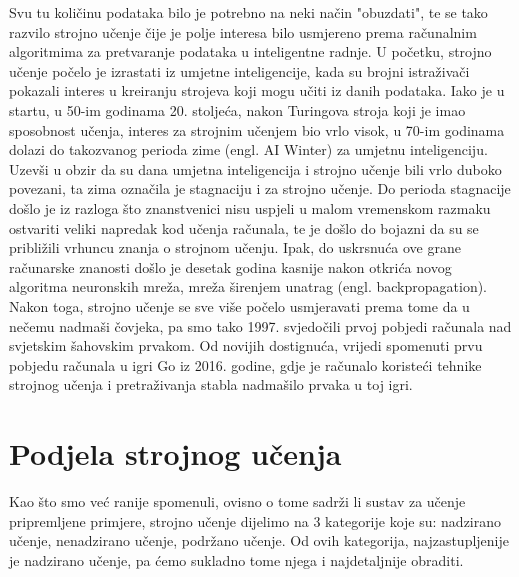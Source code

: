\documentclass[times, utf8, zavrsni, numeric]{fer}
\begin{document}
Svu tu količinu podataka bilo je potrebno na neki način "obuzdati", te se tako razvilo strojno učenje čije je polje interesa bilo usmjereno prema računalnim algoritmima za pretvaranje podataka u inteligentne radnje. U početku, strojno učenje počelo je izrastati iz umjetne inteligencije, kada su brojni istraživači pokazali interes u kreiranju strojeva koji mogu učiti iz danih podataka. Iako je u startu, u 50-im godinama 20. stoljeća, nakon Turingova stroja koji je imao sposobnost učenja, interes za strojnim učenjem bio vrlo visok, u 70-im godinama dolazi do takozvanog perioda zime (engl. AI Winter) za umjetnu inteligenciju. Uzevši u obzir da su dana umjetna inteligencija i strojno učenje bili vrlo duboko povezani, ta zima označila je stagnaciju i za strojno učenje. Do perioda stagnacije došlo je iz razloga što znanstvenici nisu uspjeli u malom vremenskom razmaku ostvariti veliki napredak kod učenja računala, te je došlo do bojazni da su se približili vrhuncu znanja o strojnom učenju. Ipak, do uskrsnuća ove grane računarske znanosti došlo je desetak godina kasnije nakon otkrića novog algoritma neuronskih mreža, mreža širenjem unatrag (engl. backpropagation). Nakon toga, strojno učenje se sve više počelo usmjeravati prema tome da u nečemu nadmaši čovjeka, pa smo tako 1997. svjedočili prvoj pobjedi računala nad svjetskim šahovskim prvakom. Od novijih dostignuća, vrijedi spomenuti prvu pobjedu računala u igri Go iz 2016. godine, gdje je računalo koristeći tehnike strojnog učenja i pretraživanja stabla nadmašilo prvaka u toj igri.

\section{Podjela strojnog učenja}
Kao što smo već ranije spomenuli, ovisno o tome sadrži li sustav za učenje pripremljene primjere, strojno učenje dijelimo na 3 kategorije koje su: nadzirano učenje, nenadzirano učenje, podržano učenje. Od ovih kategorija, najzastupljenije je nadzirano učenje, pa ćemo sukladno tome njega i najdetaljnije obraditi.
\end{document}
